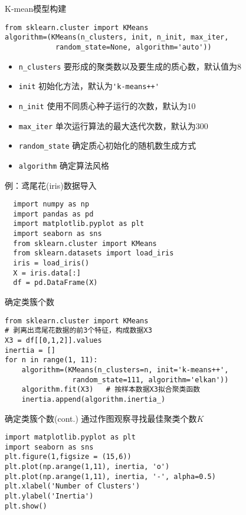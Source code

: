 \documentclass[t]{beamer}
\begin{document}
\begin{frame}[fragile]{K-mean模型构建}
\begin{lstlisting}
from sklearn.cluster import KMeans
algorithm=(KMeans(n_clusters, init, n_init, max_iter, 
            random_state=None, algorithm='auto'))
\end{lstlisting}
\begin{itemize}
  \item \verb|n_clusters| 要形成的聚类数以及要生成的质心数，默认值为8
  \item \verb|init| 初始化方法，默认为\verb|'k-means++'|
  \item \verb|n_init| 使用不同质心种子运行的次数，默认为10
  \item \verb|max_iter| 单次运行算法的最大迭代次数，默认为300
  \item \verb|random_state| 确定质心初始化的随机数生成方式
  \item \verb|algorithm| 确定算法风格
\end{itemize}
\end{frame}

\begin{frame}[fragile]{例：鸢尾花(iris)数据导入}
  \begin{lstlisting}
  import numpy as np  
  import pandas as pd 
  import matplotlib.pyplot as plt
  import seaborn as sns
  from sklearn.cluster import KMeans 
  from sklearn.datasets import load_iris
  iris = load_iris()
  X = iris.data[:]
  df = pd.DataFrame(X)
  \end{lstlisting}
  \end{frame}

\begin{frame}[fragile]{确定类簇个数}
\begin{lstlisting}
from sklearn.cluster import KMeans 
# 剥离出鸢尾花数据的前3个特征，构成数据X3
X3 = df[[0,1,2]].values  
inertia = []
for n in range(1, 11):
    algorithm=(KMeans(n_clusters=n, init='k-means++', 
                random_state=111, algorithm='elkan'))
    algorithm.fit(X3)   # 按样本数据X3拟合聚类函数
    inertia.append(algorithm.inertia_)
\end{lstlisting}
\end{frame}

\begin{frame}[fragile]{确定类簇个数(cont.)}
  通过作图观察寻找最佳聚类个数$K$
\begin{lstlisting}
import matplotlib.pyplot as plt 
import seaborn as sns
plt.figure(1,figsize = (15,6)) 
plt.plot(np.arange(1,11), inertia, 'o') 
plt.plot(np.arange(1,11), inertia, '-', alpha=0.5)
plt.xlabel('Number of Clusters') 
plt.ylabel('Inertia') 
plt.show()
\end{lstlisting}
\end{frame}
\end{document}
